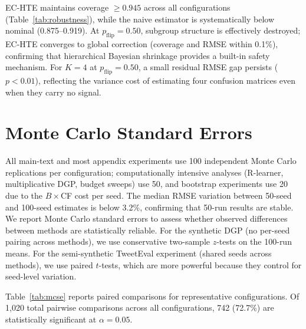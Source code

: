 EC-HTE maintains coverage $\geq 0.945$ across all configurations (Table~\ref{tab:robustness}), while the naive estimator is systematically below nominal (0.875--0.919).
At $p_{\text{flip}} = 0.50$, subgroup structure is effectively destroyed; EC-HTE converges to global correction (coverage and RMSE within 0.1\%), confirming that hierarchical Bayesian shrinkage provides a built-in safety mechanism.
For $K{=}4$ at $p_{\text{flip}} = 0.50$, a small residual RMSE gap persists ($p < 0.01$), reflecting the variance cost of estimating four confusion matrices even when they carry no signal.

\section{Monte Carlo Standard Errors}
\label{app:mcse}

All main-text and most appendix experiments use 100 independent Monte Carlo replications per configuration; computationally intensive analyses (R-learner, multiplicative DGP, budget sweeps) use 50, and bootstrap experiments use 20 due to the $B{\times}$CF cost per seed.
The median RMSE variation between 50-seed and 100-seed estimates is below 3.2\%, confirming that 50-run results are stable.
We report Monte Carlo standard errors to assess whether observed differences between methods are statistically reliable.
For the synthetic DGP (no per-seed pairing across methods), we use conservative two-sample $z$-tests on the 100-run means.
For the semi-synthetic TweetEval experiment (shared seeds across methods), we use paired $t$-tests, which are more powerful because they control for seed-level variation.

Table~\ref{tab:mcse} reports paired comparisons for representative configurations.
Of 1{,}020 total pairwise comparisons across all configurations, 742 (72.7\%) are statistically significant at $\alpha = 0.05$.

